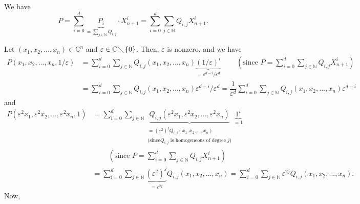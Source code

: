 \documentclass[etingof-lie.tex]{subfiles}
\begin{document}
We have%
\[
P=\sum\limits_{i=0}^{d}\underbrace{P_{i}}_{=\sum\limits_{j\in\mathbb{N}%
}Q_{i,j}}\cdot X_{n+1}^{i}=\sum\limits_{i=0}^{d}\sum\limits_{j\in\mathbb{N}%
}Q_{i,j}X_{n+1}^{i}.
\]


Let $\left(  x_{1},x_{2},...,x_{n}\right)  \in\mathbb{C}^{n}$ and
$\varepsilon\in\mathbb{C}\diagdown\left\{  0\right\}  $. Then, $\varepsilon$
is nonzero, and we have%
\begin{align*}
P\left(  x_{1},x_{2},...,x_{n},1/\varepsilon\right)   &  =\sum\limits_{i=0}%
^{d}\sum\limits_{j\in\mathbb{N}}Q_{i,j}\left(  x_{1},x_{2},...,x_{n}\right)
\underbrace{\left(  1/\varepsilon\right)  ^{i}}_{=\varepsilon^{d-i}%
/\varepsilon^{d}}\ \ \ \ \ \ \ \ \ \ \left(  \text{since }P=\sum
\limits_{i=0}^{d}\sum\limits_{j\in\mathbb{N}}Q_{i,j}X_{n+1}^{i}\right) \\
&  =\sum\limits_{i=0}^{d}\sum\limits_{j\in\mathbb{N}}Q_{i,j}\left(
x_{1},x_{2},...,x_{n}\right)  \varepsilon^{d-i}/\varepsilon^{d}=\dfrac
{1}{\varepsilon^{d}}\sum\limits_{i=0}^{d}\sum\limits_{j\in\mathbb{N}}%
Q_{i,j}\left(  x_{1},x_{2},...,x_{n}\right)  \varepsilon^{d-i}%
\end{align*}
and%
\begin{align*}
P\left(  \varepsilon^{2}x_{1},\varepsilon^{2}x_{2},...,\varepsilon^{2}%
x_{n},1\right)   &  =\sum\limits_{i=0}^{d}\sum\limits_{j\in\mathbb{N}%
}\underbrace{Q_{i,j}\left(  \varepsilon^{2}x_{1},\varepsilon^{2}%
x_{2},...,\varepsilon^{2}x_{n}\right)  }_{\substack{=\left(  \varepsilon
^{2}\right)  ^{j}Q_{i,j}\left(  x_{1},x_{2},...,x_{n}\right)  \\\text{(since
}Q_{i,j}\text{ is homogeneous of degree }j\text{)}}}\underbrace{1^{i}}_{=1}\\
&  \ \ \ \ \ \ \ \ \ \ \left(  \text{since }P=\sum\limits_{i=0}^{d}%
\sum\limits_{j\in\mathbb{N}}Q_{i,j}X_{n+1}^{i}\right) \\
&  =\sum\limits_{i=0}^{d}\sum\limits_{j\in\mathbb{N}}\underbrace{\left(
\varepsilon^{2}\right)  ^{j}}_{=\varepsilon^{2j}}Q_{i,j}\left(  x_{1}%
,x_{2},...,x_{n}\right)  =\sum\limits_{i=0}^{d}\sum\limits_{j\in\mathbb{N}%
}\varepsilon^{2j}Q_{i,j}\left(  x_{1},x_{2},...,x_{n}\right)  .
\end{align*}
Now,%
\end{document}
